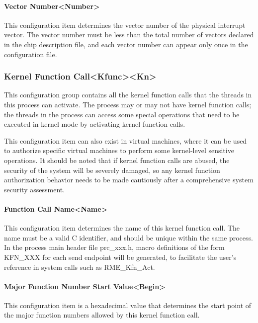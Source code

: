\paragraph{Vector Number<Number>{}}\label{par:5-3-14-21-2}

This configuration item determines the vector number of the physical interrupt vector. The vector number must be less than the total number of vectors declared in the chip description file, and each vector number can appear only once in the configuration file.

\subsubsection{Kernel Function Call<Kfunc><Kn>{}}\label{subsubsec:5-3-14-22}

This configuration group contains all the kernel function calls that the threads in this process can activate. The process may or may not have kernel function calls; the threads in the process can access some special operations that need to be executed in kernel mode by activating kernel function calls.

This configuration item can also exist in virtual machines, where it can be used to authorize specific virtual machines to perform some kernel-level sensitive operations. It should be noted that if kernel function calls are abused, the security of the system will be severely damaged, so any kernel function authorization behavior needs to be made cautiously after a comprehensive system security assessment.

\paragraph{Function Call Name<Name>{}}\label{par:5-3-14-22-1}

This configuration item determines the name of this kernel function call. The name must be a valid C identifier, and should be unique within the same process. In the process main header file prc\_xxx.h, macro definitions of the form KFN\_XXX for each send endpoint will be generated, to facilitate the user's reference in system calls such as RME\_Kfn\_Act.

\paragraph{Major Function Number Start Value<Begin>{}}\label{par:5-3-14-22-2}

This configuration item is a hexadecimal value that determines the start point of the major function numbers allowed by this kernel function call.

